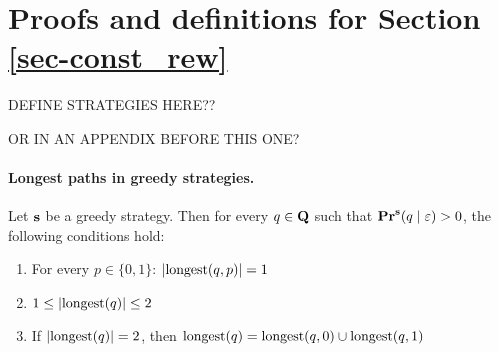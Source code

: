 
\section{Proofs and definitions for Section \ref{sec-const_rew}}
\label{app-const}

DEFINE STRATEGIES HERE??

OR IN AN APPENDIX BEFORE THIS ONE?

\paragraph{Longest paths in greedy strategies.}

\begin{mylem}\label{lem-length-greedy}
Let $\mathbf{s}$ be a greedy strategy. Then for every $q \in \mathbf{Q}$ such that $\mathbf{Pr}^{\mathbf{s}}(q \mid \varepsilon) > 0$, the following conditions hold:
\begin{enumerate}
\item For every $p \in \{0,1\}$: $|{\text{\rm longest}}(q,p)| = 1$ 

\item $1 \leq |{\text{\rm longest}}(q)| \leq 2$

\item If $|{\text{\rm longest}}(q)| = 2$, then ${\text{\rm longest}}(q) = {\text{\rm longest}}(q,0) \cup {\text{\rm longest}}(q,1)$
\end{enumerate}
\end{mylem}

